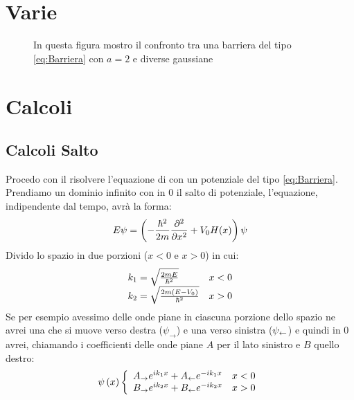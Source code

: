 \section{Varie}

\begin{figure}[hbt]
	\centering
	\caption{In questa figura mostro il confronto tra una barriera del tipo \eqref{eq:Barriera} con $a=2$ e diverse gaussiane}
\end{figure}

\section{Calcoli}
\subsection{Calcoli Salto}\label{sec:Salto}
Procedo con il risolvere l'equazione di \Schrodinger con un potenziale del tipo \eqref{eq:Barriera}.
Prendiamo un dominio infinito con in 0 il salto di potenziale, l'equazione, indipendente dal tempo, avr\`a la forma:
\begin{equation}
E\psi = \lrt{-\frac{\hbar^2}{2m}\pde{^2}{x^2}+V_0H(x)}\psi
\end{equation}
Divido lo spazio in due porzioni ($x<0$ e $x>0$) in cui:
\begin{equation}\label{eq:Ks}
\begin{array}{lr}
k_1 = \sqrt\frac{2m E}{\hbar^2}&x<0\\
k_2 = \sqrt\frac{2m \lrt{E-V_0}}{\hbar^2}&x>0
\end{array}
\end{equation}
Se per esempio avessimo delle onde piane in ciascuna porzione dello spazio ne avrei una che si muove verso destra ($\psi_\to$) e una verso sinistra ($\psi_\from$) e quindi in 0 avrei, chiamando i coefficienti delle onde piane $A$ per il lato sinistro e $B$ quello destro:
\begin{equation}
\psi\lrt x\lr\{.{\begin{array}{lr}
	A_\to e^{ik_1x} + A_\from e^{-ik_1x}	&	x<0\\
	B_\to e^{ik_2x} + B_\from e^{-ik_2x}	&	x>0
	\end{array}}
\end{equation}

